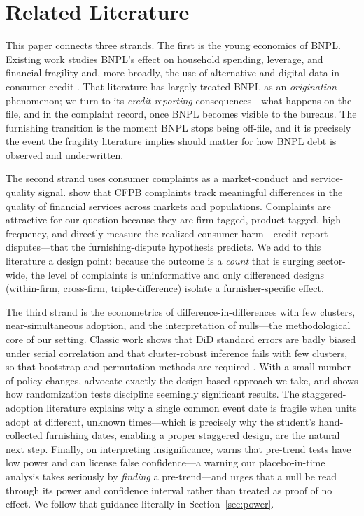 \documentclass[12pt]{article}
\begin{document}
\section{Related Literature}\label{sec:lit}
This paper connects three strands. The first is the young economics of BNPL. Existing work
studies BNPL's effect on household spending, leverage, and financial fragility
\citep{dimaggio2022,guttman2023} and, more broadly, the use of alternative and digital data in
consumer credit \citep{berg2020}. That literature has largely treated BNPL as an
\emph{origination} phenomenon; we turn to its \emph{credit-reporting} consequences---what
happens on the file, and in the complaint record, once BNPL becomes visible to the bureaus.
The furnishing transition is the moment BNPL stops being off-file, and it is precisely the
event the fragility literature implies should matter for how BNPL debt is observed and
underwritten.

The second strand uses consumer complaints as a market-conduct and service-quality signal.
\citet{begley2021} show that CFPB complaints track meaningful differences in the quality of
financial services across markets and populations. Complaints are attractive for our question
because they are firm-tagged, product-tagged, high-frequency, and directly measure the realized
consumer harm---credit-report disputes---that the furnishing-dispute hypothesis predicts. We
add to this literature a design point: because the outcome is a \emph{count} that is surging
sector-wide, the level of complaints is uninformative and only differenced designs (within-firm,
cross-firm, triple-difference) isolate a furnisher-specific effect.

The third strand is the econometrics of difference-in-differences with few clusters,
near-simultaneous adoption, and the interpretation of nulls---the methodological core of our
setting. Classic work shows that DiD standard errors are badly biased under serial correlation
\citep{bertrand2004} and that cluster-robust inference fails with few clusters, so that
bootstrap and permutation methods are required \citep{cameron2008,mackinnon2017}. With a small
number of policy changes, \citet{conley2011} advocate exactly the design-based approach we take,
and \citet{young2019} shows how randomization tests discipline seemingly significant results.
The staggered-adoption literature \citep{callaway2021,goodmanbacon2021} explains why a single
common event date is fragile when units adopt at different, unknown times---which is precisely
why the student's hand-collected furnishing dates, enabling a proper staggered design, are the
natural next step. Finally, on interpreting insignificance, \citet{roth2022} warns that
pre-trend tests have low power and can license false confidence---a warning our placebo-in-time
analysis takes seriously by \emph{finding} a pre-trend---and \citet{abadie2020} urges that a
null be read through its power and confidence interval rather than treated as proof of no
effect. We follow that guidance literally in Section~\ref{sec:power}.
\end{document}
